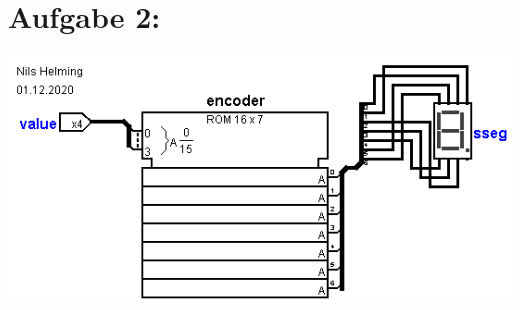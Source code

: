 \documentclass[]{article}
\begin{document}
\section*{Aufgabe 2:}
	\begin{center}\includegraphics[scale=0.7]{Bilder/2.png}\end{center}
\end{document}
